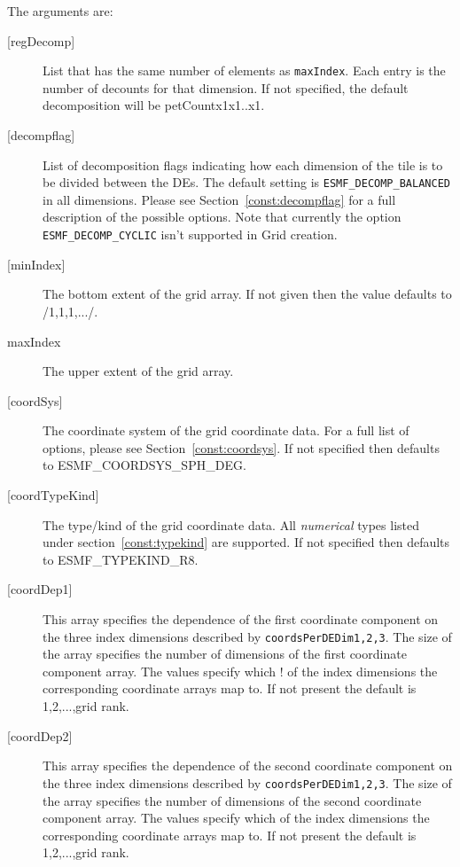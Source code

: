    The arguments are:
   \begin{description}
   \item[{[regDecomp]}]
        List that has the same number of elements as {\tt maxIndex}.
        Each entry is the number of decounts for that dimension.
        If not specified, the default decomposition will be petCountx1x1..x1.
   \item[{[decompflag]}]
        List of decomposition flags indicating how each dimension of the
        tile is to be divided between the DEs. The default setting
        is {\tt ESMF\_DECOMP\_BALANCED} in all dimensions. Please see
        Section~\ref{const:decompflag} for a full description of the
        possible options. Note that currently the option
        {\tt ESMF\_DECOMP\_CYCLIC} isn't supported in Grid creation.
   \item[{[minIndex]}]
        The bottom extent of the grid array. If not given then the value defaults
        to /1,1,1,.../.
   \item[maxIndex]
        The upper extent of the grid array.
   \item[{[coordSys]}]
       The coordinate system of the grid coordinate data.
       For a full list of options, please see Section~\ref{const:coordsys}.
       If not specified then defaults to ESMF\_COORDSYS\_SPH\_DEG.
   \item[{[coordTypeKind]}]
       The type/kind of the grid coordinate data. All {\em numerical} types
       listed under section~\ref{const:typekind} are supported.
       If not specified then defaults to ESMF\_TYPEKIND\_R8.
   \item[{[coordDep1]}]
       This array specifies the dependence of the first
       coordinate component on the three index dimensions
       described by {\tt coordsPerDEDim1,2,3}. The size of the
       array specifies the number of dimensions of the first
       coordinate component array. The values specify which
  !     of the index dimensions the corresponding coordinate
       arrays map to. If not present the default is 1,2,...,grid rank.
   \item[{[coordDep2]}]
       This array specifies the dependence of the second
       coordinate component on the three index dimensions
       described by {\tt coordsPerDEDim1,2,3}. The size of the
       array specifies the number of dimensions of the second
       coordinate component array. The values specify which
       of the index dimensions the corresponding coordinate
       arrays map to. If not present the default is 1,2,...,grid rank.

\end{description}
